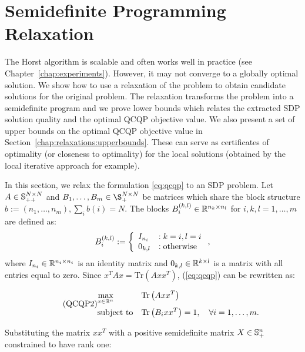 \section{Semidefinite Programming Relaxation}\label{chap:relaxations:sdp}
The Horst algorithm is scalable and often works well in
practice (see Chapter~\ref{chap:experiments}).
However, it may not converge to a globally optimal
solution. We show how to use a relaxation of the problem to obtain
candidate solutions for the original problem. The relaxation
transforms the problem into a  semidefinite program and we
prove  lower bounds which relates the extracted SDP solution
quality and the optimal QCQP objective value. We also present
a set of upper bounds on the optimal QCQP objective value in Section~\ref{chap:relaxations:upperbounds}.
These can serve as certificates of optimality (or closeness to
optimality) for the local solutions (obtained by the local iterative approach for example).

In this section, we relax the formulation \ref{eq:qcqp} to an SDP problem.
Let $A \in \mathbb{S}_{++}^{N \times N}$ and $B_1, \ldots, B_m \in \S_{+}^{N \times N}$ be matrices
which share the block structure $b := \left(n_1, \ldots, n_m\right), \sum_i b\left(i\right) = N$.
The blocks $B_i^{(k,l)} \in \mathbb{R}^{n_k \times n_l}$ for $i,k,l = 1,\ldots,m$ are defined as:
$$
B_i^{(k,l)} := \left\{
     \begin{array}{l l}
       I_{n_i} & : k = i, l = i\\
       0_{k,l} & : \textnormal{otherwise}
     \end{array}
   \right.,
$$
where $I_{n_i} \in \mathbb{R}^{n_i \times n_i}$ is an identity matrix and $0_{k,l} \in \mathbb{R}^{k \times l}$ is
a matrix with all entries equal to zero. Since $x^T A x = \mathrm{Tr}\left( A x x^T\right)$, (\ref{eq:qcqp})
can be rewritten as:

\begin{equation}\label{eq:qcqp2}
\tag{QCQP2}
\begin{aligned}
& \underset{x \in \mathbb{R}^n}{\text{max}}
& &\mathrm{Tr}\left(A x x^T\right) \\
& \text{subject to}
& &\mathrm{Tr}\left(B_i x x^T\right) = 1,  \quad\forall i =1,\ldots,m.\\
\end{aligned}
\end{equation}

Substituting the matrix $x x^T$ with a positive semidefinite matrix $X \in \mathbb{S}_{+}^{n}$ constrained to have rank one:

